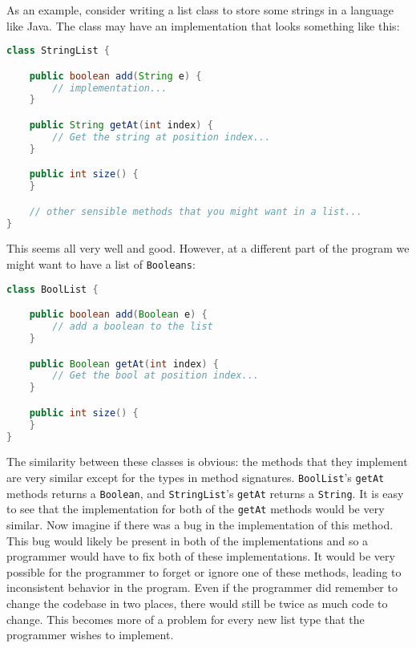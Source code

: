 As an example, consider writing a list class to store some strings in a
language like Java. The class may have an implementation that looks something
like this:

\begin{lstlisting}[caption=String List in Java, language=Java, label={lst:javastringlist}]
class StringList {

    public boolean add(String e) {
        // implementation...
    }

    public String getAt(int index) {
        // Get the string at position index...
    }

    public int size() {
    }

    // other sensible methods that you might want in a list...
}
\end{lstlisting}

This seems all very well and good. However, at a different part of the program
we might want to have a list of \lstinline{Booleans}:

\begin{lstlisting}[caption=A very similar class, language=Java, label={lst:javaboolist}]
class BoolList {

    public boolean add(Boolean e) {
        // add a boolean to the list
    }

    public Boolean getAt(int index) {
        // Get the bool at position index...
    }

    public int size() {
    }
}
\end{lstlisting}

The similarity between these classes is obvious: the methods that they
implement are very similar except for the types in method signatures.
\lstinline{BoolList}'s \lstinline{getAt} methods returns a \lstinline{Boolean},
and \lstinline{StringList}'s \lstinline{getAt} returns a \lstinline{String}. It
is easy to see that the implementation for both of the \lstinline{getAt}
methods would be very similar.  Now imagine if there was a bug in the
implementation of this method. This bug would likely be present in both of the
implementations and so a programmer would have to fix both of these
implementations. It would be very possible for the programmer to forget or
ignore one of these methods, leading to inconsistent behavior in the program.
Even if the programmer did remember to change the codebase in two places, there
would still be twice as much code to change. This becomes more of a problem for
every new list type that the programmer wishes to implement.


